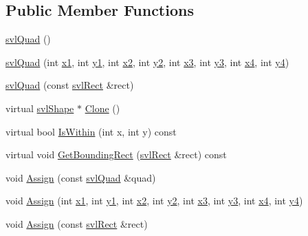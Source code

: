 \subsection*{Public Member Functions}
\begin{DoxyCompactItemize}
\item 
\hyperlink{structsvl_quad_adc7cb343b8cbd3d4e937aef6b412fe74}{svl\-Quad} ()
\item 
\hyperlink{structsvl_quad_abf897137dbfbc6d04dd301b2387640ea}{svl\-Quad} (int \hyperlink{structsvl_quad_addbddfb4d8835305e7993bc95beb5396}{x1}, int \hyperlink{structsvl_quad_a27d5a63998c61d8e3d0a6a8d49b0f867}{y1}, int \hyperlink{structsvl_quad_ad76051b0fd6671b8c7d8a789a0c0bf2b}{x2}, int \hyperlink{structsvl_quad_af793c440c3bca87d594bb157fbf7a129}{y2}, int \hyperlink{structsvl_quad_ab057dbdbfeafdb523773a523d8bb3ed3}{x3}, int \hyperlink{structsvl_quad_a0e4a4b82cc4977a4ac0e9159983e0d89}{y3}, int \hyperlink{structsvl_quad_aa2161465036bb13654d38e6aa4272493}{x4}, int \hyperlink{structsvl_quad_ab868a587999108937b8dd2748e90e1dd}{y4})
\item 
\hyperlink{structsvl_quad_a47bcb9855a08a7c2adfb6446b284d691}{svl\-Quad} (const \hyperlink{structsvl_rect}{svl\-Rect} \&rect)
\item 
virtual \hyperlink{structsvl_shape}{svl\-Shape} $\ast$ \hyperlink{structsvl_quad_aafafc8548efd62a8004ebd5524f591cc}{Clone} ()
\item 
virtual bool \hyperlink{structsvl_quad_abedb508327ec828272250fb997487c84}{Is\-Within} (int x, int y) const 
\item 
virtual void \hyperlink{structsvl_quad_ae9df9c90e19d699de3a48af7182f175f}{Get\-Bounding\-Rect} (\hyperlink{structsvl_rect}{svl\-Rect} \&rect) const 
\item 
void \hyperlink{structsvl_quad_a7d4eee8e04f8e0e32c2f0662a75e4b1e}{Assign} (const \hyperlink{structsvl_quad}{svl\-Quad} \&quad)
\item 
void \hyperlink{structsvl_quad_a67a093f2b93f00441e5221fbcc33d0f1}{Assign} (int \hyperlink{structsvl_quad_addbddfb4d8835305e7993bc95beb5396}{x1}, int \hyperlink{structsvl_quad_a27d5a63998c61d8e3d0a6a8d49b0f867}{y1}, int \hyperlink{structsvl_quad_ad76051b0fd6671b8c7d8a789a0c0bf2b}{x2}, int \hyperlink{structsvl_quad_af793c440c3bca87d594bb157fbf7a129}{y2}, int \hyperlink{structsvl_quad_ab057dbdbfeafdb523773a523d8bb3ed3}{x3}, int \hyperlink{structsvl_quad_a0e4a4b82cc4977a4ac0e9159983e0d89}{y3}, int \hyperlink{structsvl_quad_aa2161465036bb13654d38e6aa4272493}{x4}, int \hyperlink{structsvl_quad_ab868a587999108937b8dd2748e90e1dd}{y4})
\item 
void \hyperlink{structsvl_quad_a2b4ca7b0a72b7b3b87679d990ee4ccfa}{Assign} (const \hyperlink{structsvl_rect}{svl\-Rect} \&rect)
\end{DoxyCompactItemize}
